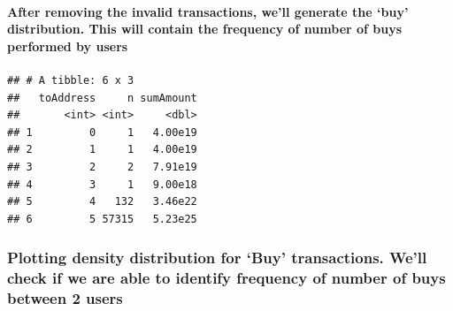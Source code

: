 \documentclass[]{article}
\newenvironment{Shaded}{\begin{snugshade}}{\end{snugshade}}
\newcommand{\KeywordTok}[1]{\textcolor[rgb]{0.13,0.29,0.53}{\textbf{#1}}}
\newcommand{\DataTypeTok}[1]{\textcolor[rgb]{0.13,0.29,0.53}{#1}}
\newcommand{\StringTok}[1]{\textcolor[rgb]{0.31,0.60,0.02}{#1}}
\newcommand{\OperatorTok}[1]{\textcolor[rgb]{0.81,0.36,0.00}{\textbf{#1}}}
\newcommand{\NormalTok}[1]{#1}
\let\oldparagraph\paragraph
\renewcommand{\paragraph}[1]{\oldparagraph{#1}\mbox{}}
\begin{document}
\paragraph{\texorpdfstring{After removing the invalid transactions,
we'll generate the `buy' distribution. This will contain the frequency
of number of buys performed by
users}{After removing the invalid transactions, we'll generate the buy distribution. This will contain the frequency of number of buys performed by users}}\label{after-removing-the-invalid-transactions-well-generate-the-buy-distribution.-this-will-contain-the-frequency-of-number-of-buys-performed-by-users-2}

\begin{Shaded}
\end{Shaded}

\begin{verbatim}
## # A tibble: 6 x 3
##   toAddress     n sumAmount
##       <int> <int>     <dbl>
## 1         0     1   4.00e19
## 2         1     1   4.00e19
## 3         2     2   7.91e19
## 4         3     1   9.00e18
## 5         4   132   3.46e22
## 6         5 57315   5.23e25
\end{verbatim}

\subsubsection{\texorpdfstring{Plotting density distribution for `Buy'
transactions. We'll check if we are able to identify frequency of number
of buys between 2
users}{Plotting density distribution for Buy transactions. We'll check if we are able to identify frequency of number of buys between 2 users}}\label{plotting-density-distribution-for-buy-transactions.-well-check-if-we-are-able-to-identify-frequency-of-number-of-buys-between-2-users-2}
\end{document}
